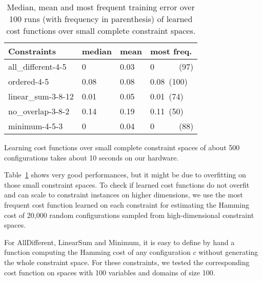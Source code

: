 \documentclass{article}
\begin{document}



\begin{table}
  \centering
\begin{tabular}{|l|l|l|l|}
  \hline
  Constraints & median & mean & most freq.\\
  \hline
  all\_different-4-5 & 0 & 0.03 & 0~~~~~~(97)\\
  ordered-4-5 & 0.08 & 0.08 & 0.08~(100)\\
  linear\_sum-3-8-12 & 0.01 & 0.05 & 0.01~(74)\\
  no\_overlap-3-8-2 & 0.14 & 0.19 & 0.11~(50)\\
  minimum-4-5-3 & 0 & 0.04 & 0~~~~~~(88)\\
  \hline
\end{tabular}
\caption{Median, mean and  most frequent training error  over 100 runs
  (with frequency in parenthesis) of learned cost functions over small
  complete constraint spaces.}
\label{tab:cf_small}
\end{table}

Learning cost functions over small complete constraint spaces of about
500 configurations takes about 10 seconds on our hardware.

Table~\ref{tab:cf_small} shows very good performances, but it might be
due  to overfitting  on those  small constraint  spaces.  To  check if
learned  cost functions  do not  overfit and  can scale  to constraint
instances on higher dimensions, we use the most frequent cost function
learned on each  constraint for estimating the Hamming  cost of 20,000
random configurations sampled from high-dimensional constraint spaces.

For AllDifferent, LinearSum and Minimum, it  is easy to define by hand
a function computing the Hamming cost of any configuration $c$ without
generating  the  whole constraint  space.  For  these constraints,  we
tested the  corresponding cost function  on spaces with  100 variables
and domains of size 100.
\end{document}
